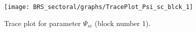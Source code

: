 \begin{figure}[H]
\centering
  \texttt{[image: BRS\_sectoral/graphs/TracePlot\_Psi\_sc\_blck\_1]}\\
    \caption{Trace plot for parameter ${\Psi_{sc}}$ (block number 1).}
\end{figure}
